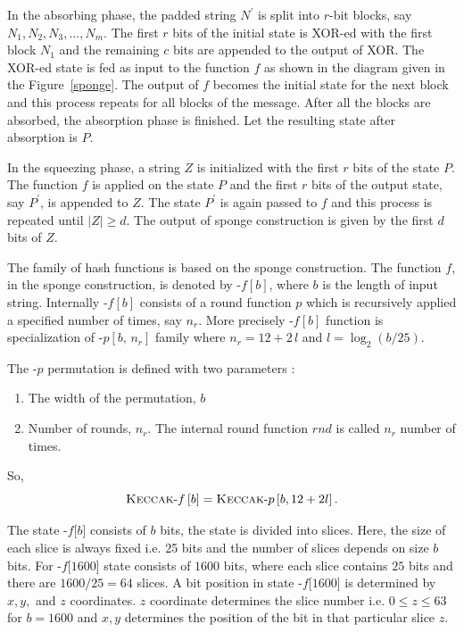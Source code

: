 In the absorbing phase, the padded string $N^\prime$ is split into $r$-bit blocks, say $N_1, N_2, N_3,\ldots,N_m$. The first $r$ bits of the initial state is XOR-ed with the first block $N_1$ and the remaining $c$ bits are appended to the output of XOR. The XOR-ed state is fed as input to the function $f$ as shown in the diagram given in the Figure~\ref{sponge}. The output of $f$ becomes the initial state for the next block and this process repeats for all blocks of the message. After all the blocks are absorbed, the absorption phase is finished. Let the resulting state after absorption is $P$. 

In the squeezing phase, a string $Z$ is initialized with the first $r$ bits of the state $P$. The function $f$ is applied on the state $P$ and the first $r$ bits of the output state, say $P^\prime$, is appended to $Z$. The state $P^\prime$ is again passed to $f$ and this process is repeated until $|Z| \geq d$. The output of sponge construction is given by the first $d$ bits of $Z$.

The \Keccak{} family of hash functions is based on the sponge construction. The function $f$, in the sponge construction, is denoted by \Keccak-$f\left[b\right]$, where $b$ is the length of input string. Internally \Keccak-$f\left[b\right]$ consists of a round function $p$ which is recursively applied a specified number of times, say $n_r$. More precisely \Keccak-$f\left[b\right]$ function is specialization of \Keccak-$p\left[b,\,n_r\right]$ family where $n_r = 12 + 2\,l$ and $l = \log_2 (b/25)$.

The \KECCAK-$p$ permutation is defined with two parameters :
\begin{enumerate}
    \item The width of the permutation, $b$
    \item Number of rounds, $n_r$. The internal round function $rnd$ is called $n_r$ number of times.
\end{enumerate}

So,
\[
    \mbox{\textsc{Keccak}}\text{-}f\left[b\right] = \mbox{\textsc{Keccak}}\text{-}p\left[b,  12 + 2l\right].
\]

The state \KECCAK-$f$[$b$] consists of $b$ bits, the state is divided into slices. Here, the size of each slice is always fixed i.e. 25 bits and the number of slices depends on size $b$ bits. For \KECCAK-$f$[$1600$] state consists of $1600$ bits, where each slice contains $25$ bits and there are $1600/25 = 64$ slices. A bit position in state \KECCAK-$f$[$1600$] is determined by $x, y, $ and $z$ coordinates. $z$ coordinate determines the slice number i.e. $0 \leq z \leq 63$ for $b = 1600$ and $x, y$ determines the position of the bit in that particular slice $z$.

